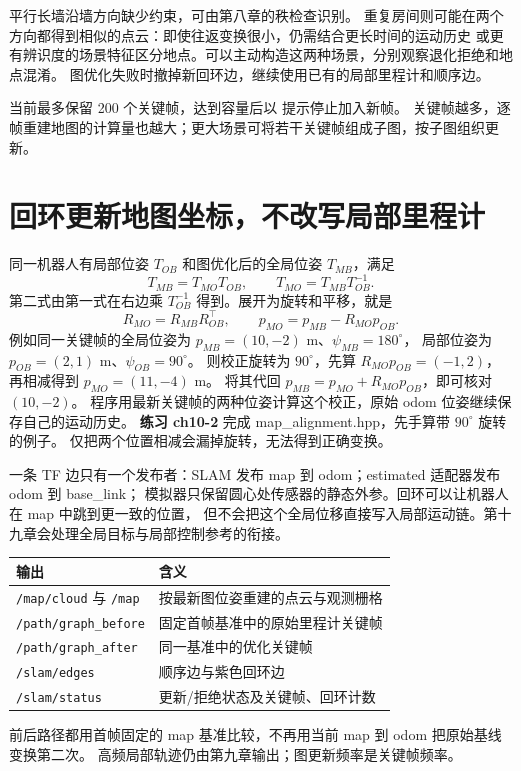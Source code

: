 平行长墙沿墙方向缺少约束，可由第八章的秩检查识别。
重复房间则可能在两个方向都得到相似的点云：即使往返变换很小，仍需结合更长时间的运动历史
或更有辨识度的场景特征区分地点。可以主动构造这两种场景，分别观察退化拒绝和地点混淆。
图优化失败时撤掉新回环边，继续使用已有的局部里程计和顺序边。

当前最多保留 200 个关键帧，达到容量后以  提示停止加入新帧。
关键帧越多，逐帧重建地图的计算量也越大；更大场景可将若干关键帧组成子图，按子图组织更新。

\clearpage
\section{回环更新地图坐标，不改写局部里程计}
同一机器人有局部位姿 $T_{OB}$ 和图优化后的全局位姿 $T_{MB}$，满足
\begin{equation}
T_{MB}=T_{MO}T_{OB},\qquad T_{MO}=T_{MB}T_{OB}^{-1}.
\end{equation}
第二式由第一式在右边乘 $T_{OB}^{-1}$ 得到。展开为旋转和平移，就是
\begin{equation}
R_{MO}=R_{MB}R_{OB}^\top,\qquad
p_{MO}=p_{MB}-R_{MO}p_{OB}.
\end{equation}
例如同一关键帧的全局位姿为 $p_{MB}=(10,-2)$ m、$\psi_{MB}=180^\circ$，
局部位姿为 $p_{OB}=(2,1)$ m、$\psi_{OB}=90^\circ$。
则校正旋转为 $90^\circ$，先算 $R_{MO}p_{OB}=(-1,2)$，再相减得到 $p_{MO}=(11,-4)$ m。
将其代回 $p_{MB}=p_{MO}+R_{MO}p_{OB}$，即可核对 $(10,-2)$。
程序用最新关键帧的两种位姿计算这个校正，原始 odom 位姿继续保存自己的运动历史。
\textbf{练习 ch10-2} 完成 map\_alignment.hpp，先手算带 $90^\circ$ 旋转的例子。
仅把两个位置相减会漏掉旋转，无法得到正确变换。



一条 TF 边只有一个发布者：SLAM 发布 map 到 odom；estimated 适配器发布 odom 到 base\_link；
模拟器只保留圆心处传感器的静态外参。回环可以让机器人在 map 中跳到更一致的位置，
但不会把这个全局位移直接写入局部运动链。第十九章会处理全局目标与局部控制参考的衔接。

\begin{center}\small
\begin{tabular}{ll}\toprule
输出 & 含义 \\\midrule
\texttt{/map/cloud} 与 \texttt{/map} & 按最新图位姿重建的点云与观测栅格 \\
\texttt{/path/graph\_before} & 固定首帧基准中的原始里程计关键帧 \\
\texttt{/path/graph\_after} & 同一基准中的优化关键帧 \\
\texttt{/slam/edges} & 顺序边与紫色回环边 \\
\texttt{/slam/status} & 更新/拒绝状态及关键帧、回环计数 \\\bottomrule
\end{tabular}
\end{center}
前后路径都用首帧固定的 map 基准比较，不再用当前 map 到 odom 把原始基线变换第二次。
高频局部轨迹仍由第九章输出；图更新频率是关键帧频率。

